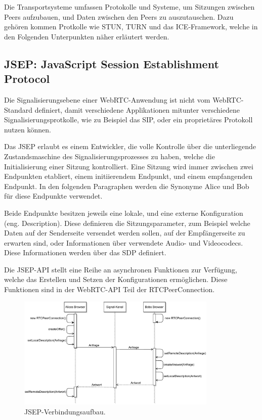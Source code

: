 Die Transportsysteme umfassen Protokolle und Systeme, um Sitzungen zwischen Peers aufzubauen, und Daten zwischen den Peers zu auszutauschen. Dazu gehören kommen Protkolle wie \acs{STUN}, \acs{TURN} und das \acs{ICE}-Framework, welche in den Folgenden Unterpunkten näher erläutert werden.

\subsection{JSEP: JavaScript Session Establishment Protocol}
Die Signalisierungsebene einer \acs{WebRTC}-Anwendung ist nicht vom \acs{WebRTC}-Standard definiert, damit verschiedene Applikationen mitunter verschiedene Signalisierungsprotkolle, wie zu Beispiel das \acf{SIP}, oder ein proprietäres Protokoll nutzen können.\par

Das \acf{JSEP} erlaubt es einem Entwickler, die volle Kontrolle über die unterliegende Zustandsmaschine des Signalisierungsprozesses zu haben, welche die Initialisierung einer Sitzung kontrolliert. Eine Sitzung wird immer zwischen zwei Endpunkten etabliert, einem initiierendem Endpunkt, und einem empfangenden Endpunkt. In den folgenden Paragraphen werden die Synonyme \glqq{}Alice\grqq{} und \glqq{}Bob\grqq{} für diese Endpunkte verwendet.\par

Beide Endpunkte besitzen jeweils eine lokale, und eine externe Konfiguration (eng. \glqq{}Description\grqq{}). Diese definieren die Sitzungsparameter, zum Beispiel welche Daten auf der Senderseite versendet werden sollen, auf der Empfängerseite zu erwarten sind, oder Informationen über verwendete Audio- und Videocodecs. Diese Informationen werden über das \acf{SDP} definiert.\par

Die \acs{JSEP}-\acs{API} stellt eine Reihe an asynchronen Funktionen zur Verfügung, welche das Erstellen und Setzen der Konfigurationen ermöglichen. Diese Funktionen sind in der \acs{WebRTC}-\acs{API} Teil der RTCPeerConnection.\par

\begin{figure}[h]
\centering
\includegraphics[width=0.85\textwidth]{bilder/PDF_SVG/JSEP.pdf}
\caption{\acs{JSEP}-Verbindungsaufbau.}
\label{fig:jsep}
\end{figure}

